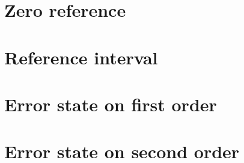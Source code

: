 \section{Zero reference}\label{app:sos_noref}

\section{Reference interval}\label{app:sos_refinterval}

\section{Error state on first order}\label{app:sos_errorstate_firstorder}

\section{Error state on second order}\label{app:sos_errorstate_secondorder}